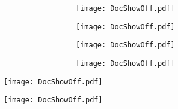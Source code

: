 \documentclass[c]{beamer}  %
\begin{document}
	
	\begin{frame}
		\frametitle{\insertsection}
		\framesubtitle{\insertsubsection}
		\begin{center}
			\begin{figure}
				\begin{subfigure}{0.5\textwidth}
					
					\begin{subfigure}[t]{\textwidth}
						\texttt{[image: DocShowOff.pdf]}	
					\end{subfigure}
					
					
					\begin{subfigure}[b]{\textwidth}
						\texttt{[image: DocShowOff.pdf]}
					\end{subfigure}
					
				\end{subfigure}%
				\begin{subfigure}{0.5\textwidth}
					\begin{subfigure}[t]{\textwidth}
						\texttt{[image: DocShowOff.pdf]}
					\end{subfigure}
					
					
					\begin{subfigure}[b]{\textwidth}
						\texttt{[image: DocShowOff.pdf]}
					\end{subfigure}
				\end{subfigure}	
			\end{figure}
		\end{center}
	\end{frame}

	\begin{frame}[plain]
		\hspace*{-0.1\textwidth}%
		\texttt{[image: DocShowOff.pdf]}
	\end{frame}

	\begin{frame}[plain]
		\hspace*{-0.1\textwidth}%
		\texttt{[image: DocShowOff.pdf]}
	\end{frame}
\end{document}
